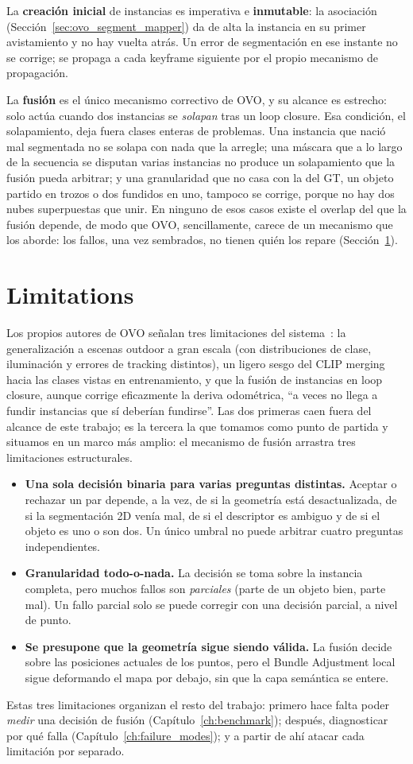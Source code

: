 La \textbf{creación inicial} de instancias es imperativa e \textbf{inmutable}: la asociación
(Sección~\ref{sec:ovo_segment_mapper}) da de alta la instancia en su primer avistamiento y no hay
vuelta atrás. Un error de segmentación en ese instante no se corrige; se propaga a cada keyframe
siguiente por el propio mecanismo de propagación.

La \textbf{fusión} es el único mecanismo correctivo de OVO, y su alcance es estrecho: solo actúa
cuando dos instancias se \emph{solapan} tras un loop closure. Esa condición, el solapamiento, deja
fuera clases enteras de problemas. Una instancia que nació mal segmentada no se solapa con nada que
la arregle; una máscara que a lo largo de la secuencia se disputan varias instancias no produce un
solapamiento que la fusión pueda arbitrar; y una granularidad que no casa con la del GT, un objeto
partido en trozos o dos fundidos en uno, tampoco se corrige, porque no hay dos nubes superpuestas que
unir. En ninguno de esos casos existe el overlap del que la fusión depende, de modo que OVO,
sencillamente, carece de un mecanismo que los aborde: los fallos, una vez sembrados, no tienen quién
los repare (Sección~\ref{sec:ovo_limitations}).

\section{Limitations}
\label{sec:ovo_limitations}

Los propios autores de OVO señalan tres limitaciones del sistema~\parencite{berrielmartins2024ovo}:
la generalización a escenas outdoor a gran escala (con distribuciones de clase, iluminación y errores
de tracking distintos), un ligero sesgo del CLIP merging hacia las clases vistas en entrenamiento, y
que la fusión de instancias en loop closure, aunque corrige eficazmente la deriva odométrica,
\enquote{a veces no llega a fundir instancias que sí deberían fundirse}. Las dos primeras caen fuera
del alcance de este trabajo; es la tercera la que tomamos como punto de partida y situamos en un
marco más amplio: el mecanismo de fusión arrastra tres limitaciones estructurales.

\begin{itemize}
  \item \textbf{Una sola decisión binaria para varias preguntas distintas.} Aceptar o rechazar un
    par depende, a la vez, de si la geometría está desactualizada, de si la segmentación 2D venía
    mal, de si el descriptor es ambiguo y de si el objeto es uno o son dos. Un único umbral no
    puede arbitrar cuatro preguntas independientes.
  \item \textbf{Granularidad todo-o-nada.} La decisión se toma sobre la instancia completa, pero
    muchos fallos son \emph{parciales} (parte de un objeto bien, parte mal). Un fallo parcial solo
    se puede corregir con una decisión parcial, a nivel de punto.
  \item \textbf{Se presupone que la geometría sigue siendo válida.} La fusión decide sobre las
    posiciones actuales de los puntos, pero el Bundle Adjustment local
    sigue deformando el mapa por debajo, sin que la capa semántica se entere.
\end{itemize}

Estas tres limitaciones organizan el resto del trabajo: primero hace falta poder \emph{medir} una
decisión de fusión (Capítulo~\ref{ch:benchmark}); después, diagnosticar por qué falla
(Capítulo~\ref{ch:failure_modes}); y a partir de ahí atacar cada limitación por separado.
